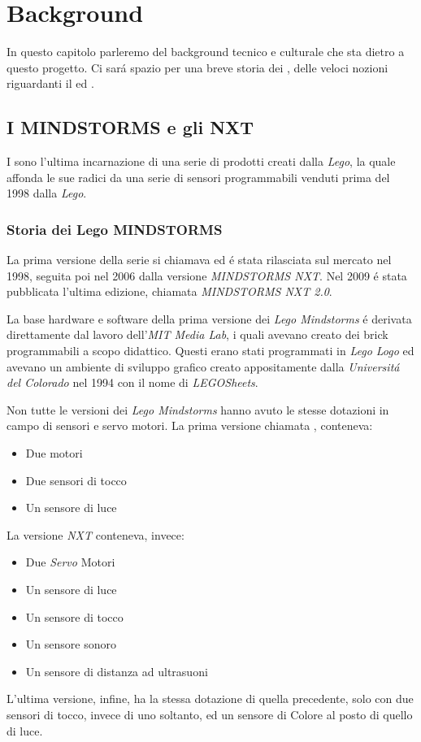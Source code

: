 \chapter{Background}
\label{chap:BG}

In questo capitolo parleremo del background tecnico e culturale che sta
dietro a questo progetto. Ci sar\'a spazio per una breve storia dei \nxt{}, 
delle veloci nozioni riguardanti il \PID{} ed \nxtOSEK{}.

\section{I MINDSTORMS e gli NXT}
I \nxt{} sono l'ultima incarnazione di una serie di prodotti creati
dalla \emph{Lego}, la quale affonda le sue radici da una serie di sensori
programmabili venduti prima del 1998 dalla \emph{Lego}.

\subsection{Storia dei Lego MINDSTORMS}
La prima versione
della serie si chiamava \RIS{} ed \'e stata rilasciata sul mercato nel
1998, seguita poi nel 2006 dalla versione \emph{MINDSTORMS NXT}. Nel 2009
\'e stata pubblicata l'ultima edizione, chiamata \emph{MINDSTORMS NXT 2.0}.

La base hardware e software della prima versione dei \emph{Lego Mindstorms}
\'e derivata direttamente dal lavoro dell'\emph{MIT Media Lab}, i quali
avevano creato dei brick programmabili a scopo didattico. Questi erano stati 
programmati in \emph{Lego Logo} ed avevano un ambiente di sviluppo grafico
creato appositamente dalla \emph{Universit\'a del Colorado} nel 1994 con il
nome di \emph{LEGOSheets}.

Non tutte le versioni dei \emph{Lego Mindstorms} hanno avuto le stesse
dotazioni in campo di sensori e servo motori. La prima versione chiamata
\RIS{}, conteneva:
\begin{itemize}
    \item Due motori
    \item Due sensori di tocco
    \item Un sensore di luce
\end{itemize}    
La versione \emph{NXT} conteneva, invece:
\begin{itemize}
    \item Due \emph{Servo} Motori
    \item Un sensore di luce
    \item Un sensore di tocco
    \item Un sensore sonoro
    \item Un sensore di distanza ad ultrasuoni
\end{itemize}
L'ultima versione, infine, ha la stessa dotazione di quella precedente,
solo con due sensori di tocco, invece di uno soltanto, ed un sensore di
Colore al posto di quello di luce. 


